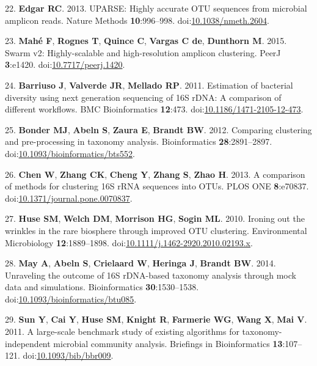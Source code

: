 \documentclass[11pt,]{article}
\begin{document}
\hypertarget{ref-Edgar2013}{}
22. \textbf{Edgar RC}. 2013. UPARSE: Highly accurate OTU sequences from
microbial amplicon reads. Nature Methods \textbf{10}:996--998.
doi:\href{https://doi.org/10.1038/nmeth.2604}{10.1038/nmeth.2604}.

\hypertarget{ref-Mah2015}{}
23. \textbf{Mahé F}, \textbf{Rognes T}, \textbf{Quince C},
\textbf{Vargas C de}, \textbf{Dunthorn M}. 2015. Swarm v2:
Highly-scalable and high-resolution amplicon clustering. PeerJ
\textbf{3}:e1420.
doi:\href{https://doi.org/10.7717/peerj.1420}{10.7717/peerj.1420}.

\hypertarget{ref-Barriuso2011}{}
24. \textbf{Barriuso J}, \textbf{Valverde JR}, \textbf{Mellado RP}.
2011. Estimation of bacterial diversity using next generation sequencing
of 16S rDNA: A comparison of different workflows. BMC Bioinformatics
\textbf{12}:473.
doi:\href{https://doi.org/10.1186/1471-2105-12-473}{10.1186/1471-2105-12-473}.

\hypertarget{ref-Bonder2012}{}
25. \textbf{Bonder MJ}, \textbf{Abeln S}, \textbf{Zaura E},
\textbf{Brandt BW}. 2012. Comparing clustering and pre-processing in
taxonomy analysis. Bioinformatics \textbf{28}:2891--2897.
doi:\href{https://doi.org/10.1093/bioinformatics/bts552}{10.1093/bioinformatics/bts552}.

\hypertarget{ref-Chen2013}{}
26. \textbf{Chen W}, \textbf{Zhang CK}, \textbf{Cheng Y}, \textbf{Zhang
S}, \textbf{Zhao H}. 2013. A comparison of methods for clustering 16S
rRNA sequences into OTUs. PLOS ONE \textbf{8}:e70837.
doi:\href{https://doi.org/10.1371/journal.pone.0070837}{10.1371/journal.pone.0070837}.

\hypertarget{ref-Huse2010}{}
27. \textbf{Huse SM}, \textbf{Welch DM}, \textbf{Morrison HG},
\textbf{Sogin ML}. 2010. Ironing out the wrinkles in the rare biosphere
through improved OTU clustering. Environmental Microbiology
\textbf{12}:1889--1898.
doi:\href{https://doi.org/10.1111/j.1462-2920.2010.02193.x}{10.1111/j.1462-2920.2010.02193.x}.

\hypertarget{ref-May2014}{}
28. \textbf{May A}, \textbf{Abeln S}, \textbf{Crielaard W},
\textbf{Heringa J}, \textbf{Brandt BW}. 2014. Unraveling the outcome of
16S rDNA-based taxonomy analysis through mock data and simulations.
Bioinformatics \textbf{30}:1530--1538.
doi:\href{https://doi.org/10.1093/bioinformatics/btu085}{10.1093/bioinformatics/btu085}.

\hypertarget{ref-Sun2011}{}
29. \textbf{Sun Y}, \textbf{Cai Y}, \textbf{Huse SM}, \textbf{Knight R},
\textbf{Farmerie WG}, \textbf{Wang X}, \textbf{Mai V}. 2011. A
large-scale benchmark study of existing algorithms for
taxonomy-independent microbial community analysis. Briefings in
Bioinformatics \textbf{13}:107--121.
doi:\href{https://doi.org/10.1093/bib/bbr009}{10.1093/bib/bbr009}.
\end{document}
